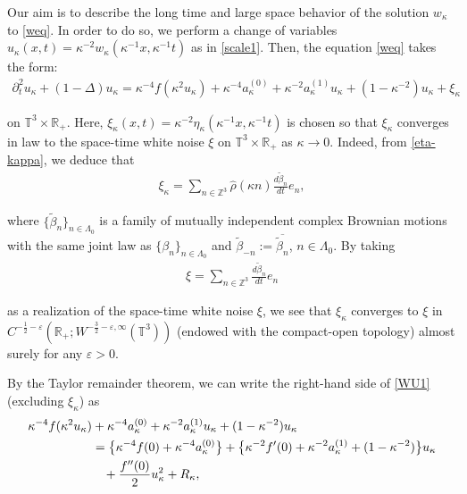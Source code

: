 \documentclass[%
11pt,  reqno]{amsart}
\newcommand{\1}{\hspace{0.2mm}\text{I}\hspace{0.2mm}}
\newcommand{\noi}{\noindent}
\newcommand{\Z}{\mathbb{Z}}
\newcommand{\R}{\mathbb{R}}
\newcommand{\T}{\mathbb{T}}
\newcommand{\be}{\beta}
\newcommand{\Dl}{\Delta}
\newcommand{\eps}{\varepsilon}
\newcommand{\kk}{\kappa}
\newcommand{\Ld}{\Lambda}
\newcommand{\ft}{\widehat}
\newcommand{\wt}{\widetilde}
\newcommand{\cj}{\overline}
\newcommand{\dt}{\partial_t}
\numberwithin{equation}{section}
\numberwithin{theorem}{section}
\begin{document}
Our aim is to describe the long time and large space behavior of the solution $w_\kk$
to \eqref{weq}.
In order to do so, we perform a change of variables 
$u_{\kk} (x, t) = \kk^{- 2} w_{\kk} (\kk^{-1} x, \kk^{-1} t)$ as in \eqref{scale1}.
Then, the equation \eqref{weq}  takes the form:
\begin{align}
\dt^2 u_{\kk} + (1 - \Dl) u_{\kk}
 = \kk^{- 4}  f (\kk^{2} u_{\kk} ) + \kk^{- 4}
   a_{\kk}^{(0)} + \kk^{- 2} a_{\kk}^{(1)} u_{\kk}
   + (1-\kk^{-2})u_\kk
    +  \xi_{\kk} 
\label{WU1}
\end{align}

\noi
on $\T^3\times \R_+$.
Here, 
 $\xi_{\kk} (x, t) = \kk^{-2} \eta_{\kk} (\kk^{-1} x, \kk^{-1} t)$ is chosen so that 
$\xi_\kk$ converges in law to 
the space-time white noise $\xi$ on $\T^3\times \R_+$ as $\kk \to 0$.
Indeed, from \eqref{eta-kappa}, 
 we deduce that
\begin{align}
\label{xi-kappa}
\xi_\kk =  \sum_{n\in \Z^3}  \ft {\rho}(\kk n)  \frac{d\wt \be _n}{dt} e_{n}, 
\end{align}

\noi
where $\{\wt \be_n\}_{n \in \Ld_0}$ is a family of 
mutually independent complex Brownian motions 
with the same joint law as $\{\beta_n\}_{n\in \Ld_0}$
and $\wt \beta_{-n} := \cj{\wt \be_n}$, $n \in \Ld_0$. 
By taking 
\begin{align*}
\xi =  \sum_{n\in \Z^3}    \frac{d\wt \be _n}{dt} e_{n}
\end{align*}

\noi
as a realization of the space-time white noise $\xi$, 
we see that $\xi_\kk$ converges to $\xi$
in $C^{-\frac 12-\eps}(\R_+; W^{-\frac 32- \eps, \infty}(\T^3))$
(endowed with the compact-open topology)
almost surely for any $\eps > 0$.


By the Taylor remainder theorem, 
we can write the right-hand side of \eqref{WU1} (excluding $\xi_\kk$)
as 
\begin{align*}
\begin{split}
 \kk^{- 4} f (\kk^{2} u_{\kk}) & + \kk^{- 4} a_{\kk}^{(0)} + \kk^{- 2} a_{\kk}^{(1)} u_{\kk} 
 +  (1-\kk^{-2})u_\kk\\
 & = \big\{\kk^{
    - 4} f (0) + \kk^{ - 4} a_{\kk}^{(0)}\big\} 
 + \big\{\kk^{- 2} f' (0) + \kk^{- 2} a_{\kk}^{(1)}+  (1-\kk^{-2}) \big\} u_{\kk}\\
 & \hphantom{X}  +
   \frac{f'' (0)}{2}   u_{\kk}^2 + R_{\kk},   
\end{split}
\end{align*}
\end{document}

